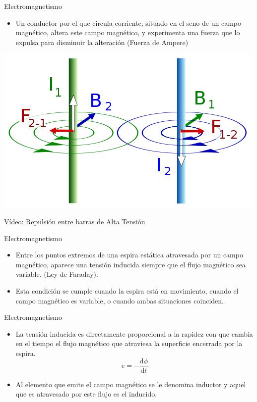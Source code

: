 \documentclass[xcolor={usenames,svgnames,dvipsnames}]{beamer}
\begin{document}
\begin{frame}[label={sec:org88f3308}]{Electromagnetismo}
\begin{itemize}
\item Un conductor por el que circula corriente, situado en el seno de un
campo magnético, altera este campo magnético, y experimenta una
fuerza que lo expulsa para disminuir la alteración (Fuerza de Ampere)
\end{itemize}

\begin{center}
\includegraphics[width=.9\linewidth]{../figs/FuerzasRepulsion.png}
\end{center}

\begin{center}
Vídeo: \href{http://www.youtube.com/watch?v=2j8D\_N1v0tU}{Repulsión entre barras de Alta Tensión}
\end{center}
\end{frame}

\begin{frame}[label={sec:org22ca8d0}]{Electromagnetismo}
\begin{itemize}
\item Entre los puntos extremos de una espira estática atravesada por un
campo magnético, aparece una \alert{tensión inducida siempre que el flujo
magnético sea variable}. (Ley de Faraday).

\item Esta condición se cumple cuando la \alert{espira está en movimiento,}
cuando el \alert{campo magnético es variable}, o cuando ambas situaciones
coinciden.
\end{itemize}
\end{frame}

\begin{frame}[label={sec:org6534dda}]{Electromagnetismo}
\begin{itemize}
\item La tensión inducida es directamente proporcional a la rapidez con que
cambia en el tiempo el flujo magnético que atraviesa la superficie
encerrada por la espira. $$e=-\frac{\mathrm{d}\phi}{\mathrm{d}t}$$

\item Al elemento que emite el campo magnético se le denomina \alert{inductor} y
aquel que es atravesado por este flujo es el \alert{inducido}.
\end{itemize}
\end{frame}
\end{document}
